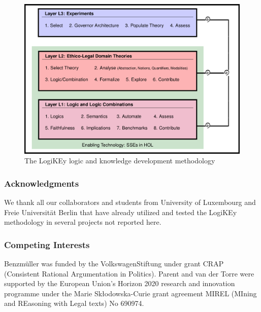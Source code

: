 \documentclass{article}
\newcommand{\comment}[1]{
}
\begin{document}
\begin{figure}[ht!]
 \includegraphics[width=\textwidth]{LogiKEy-methodology.png}
\caption{The LogiKEy logic and knowledge development methodology \label{fig:LogiKEy}}
\end{figure}


\comment{
[Offer a complete description of the experimental design and methods used to acquire these data. Please provide any programs or code files used for filtering and analyzing these data. It is very important that this section is as comprehensive as possible and if you are submitting via another Elsevier journal you are encouraged to provide more detail than in your accompanying research article. There is no character limit for this section, however, no insight, interpretation, or background should be included in this section.]  
}


\subsubsection*{Acknowledgments} We thank all our collaborators and
students from University of Luxembourg and Freie Universit\"at Berlin   
that have already utilized and tested the LogiKEy methodology in several
projects not reported here. 

\subsubsection*{Competing Interests}
Benzm\"uller was funded by the VolkswagenStiftung
  under grant CRAP (Consistent Rational Argumentation in
  Politics). Parent and van der Torre were supported by  the European
  Union's Horizon 2020 research and innovation programme under the
  Marie Sk\l{}odowska-Curie grant agreement MIREL (MIning and
  REasoning with Legal texts) No 690974.
\end{document}

